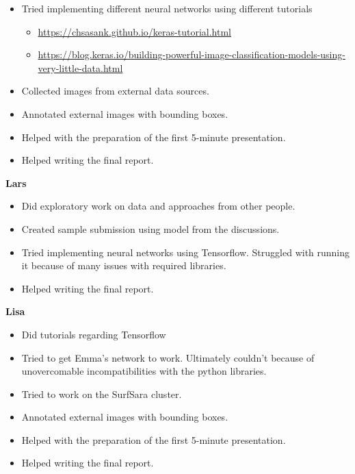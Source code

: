 \documentclass[a4paper]{article}
\begin{document}
\begin{itemize}
	\item Tried implementing different neural networks using different tutorials
	\begin{itemize}
		\item \url{https://chsasank.github.io/keras-tutorial.html}
		\item \url{https://blog.keras.io/building-powerful-image-classification-models-using-very-little-data.html}
	\end{itemize}
	\item Collected images from external data sources.
	\item Annotated external images with bounding boxes.
	\item Helped with the preparation of the first 5-minute presentation.
	\item Helped writing the final report.
\end{itemize}
\vspace{1em}

\textbf{Lars}\\

\begin{itemize}
	\item Did exploratory work on data and approaches from other people.
	\item Created sample submission using model from the discussions.
	\item Tried implementing neural networks using Tensorflow. Struggled with running it because of many issues with required libraries.
	\item Helped writing the final report.
\end{itemize}
\vspace{1em}

\textbf{Lisa}\\

\begin{itemize}
	\item Did tutorials regarding Tensorflow
	\item Tried to get Emma’s network to work. Ultimately couldn’t because of unovercomable incompatibilities with the python libraries.
	\item Tried to work on the SurfSara cluster.
	\item Annotated external images with bounding boxes.
	\item Helped with the preparation of the first 5-minute presentation.
	\item Helped writing the final report.
\end{itemize}
\end{document}
